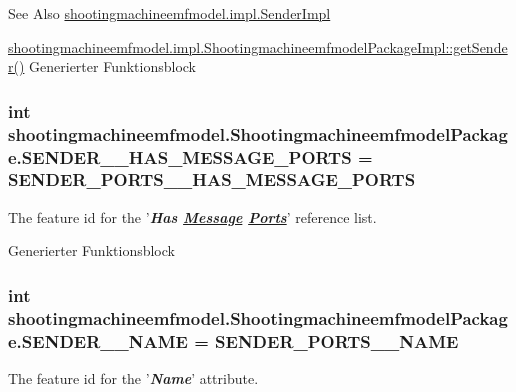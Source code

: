 \begin{DoxySeeAlso}{See Also}
\hyperlink{classshootingmachineemfmodel_1_1impl_1_1_sender_impl}{shootingmachineemfmodel.\-impl.\-Sender\-Impl} 

\hyperlink{classshootingmachineemfmodel_1_1impl_1_1_shootingmachineemfmodel_package_impl_ae9d64d90ba3a6d16470ba73e5abc0808}{shootingmachineemfmodel.\-impl.\-Shootingmachineemfmodel\-Package\-Impl\-::get\-Sender()} Generierter Funktionsblock 
\end{DoxySeeAlso}
\hypertarget{interfaceshootingmachineemfmodel_1_1_shootingmachineemfmodel_package_a7e39218752c6badebdd62172a1e09cf9}{
\subsubsection[{S\-E\-N\-D\-E\-R\-\_\-\-\_\-\-H\-A\-S\-\_\-\-M\-E\-S\-S\-A\-G\-E\-\_\-\-P\-O\-R\-T\-S}]{\setlength{\rightskip}{0pt plus 5cm}int shootingmachineemfmodel.\-Shootingmachineemfmodel\-Package.\-S\-E\-N\-D\-E\-R\-\_\-\-\_\-\-H\-A\-S\-\_\-\-M\-E\-S\-S\-A\-G\-E\-\_\-\-P\-O\-R\-T\-S = {\bf S\-E\-N\-D\-E\-R\-\_\-\-P\-O\-R\-T\-S\-\_\-\-\_\-\-H\-A\-S\-\_\-\-M\-E\-S\-S\-A\-G\-E\-\_\-\-P\-O\-R\-T\-S}}}\label{interfaceshootingmachineemfmodel_1_1_shootingmachineemfmodel_package_a7e39218752c6badebdd62172a1e09cf9}
The feature id for the '{\itshape {\bfseries Has \hyperlink{interfaceshootingmachineemfmodel_1_1_message}{Message} \hyperlink{interfaceshootingmachineemfmodel_1_1_ports}{Ports}}}' reference list.

Generierter Funktionsblock  \hypertarget{interfaceshootingmachineemfmodel_1_1_shootingmachineemfmodel_package_a1ed828768d7bc69daa2e850c3d7dc8ac}{
\subsubsection[{S\-E\-N\-D\-E\-R\-\_\-\-\_\-\-N\-A\-M\-E}]{\setlength{\rightskip}{0pt plus 5cm}int shootingmachineemfmodel.\-Shootingmachineemfmodel\-Package.\-S\-E\-N\-D\-E\-R\-\_\-\-\_\-\-N\-A\-M\-E = {\bf S\-E\-N\-D\-E\-R\-\_\-\-P\-O\-R\-T\-S\-\_\-\-\_\-\-N\-A\-M\-E}}}\label{interfaceshootingmachineemfmodel_1_1_shootingmachineemfmodel_package_a1ed828768d7bc69daa2e850c3d7dc8ac}
The feature id for the '{\itshape {\bfseries Name}}' attribute.

